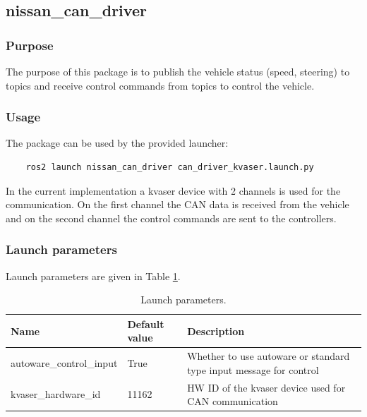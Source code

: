 \documentclass[sn-mathphys-num]{sn-jnl}%
\begin{document}
\subsection{nissan\_can\_driver}
\subsubsection{Purpose}
The purpose of this package is to publish the vehicle status (speed, steering) to topics and receive control commands from topics to control the vehicle.
\subsubsection{Usage}
The package can be used by the provided launcher:
\begin{lstlisting}
    ros2 launch nissan_can_driver can_driver_kvaser.launch.py
\end{lstlisting}
In the current implementation a kvaser device with 2 channels is used for the communication. On the first channel the CAN data is received from the vehicle and on the second channel the control commands are sent to the controllers.
\subsubsection{Launch parameters}
Launch parameters are given in Table \ref{tab:nissan_can_driver_params}.
\begin{table}[!h]
    \centering
    \captionsetup{justification=centering}
    \normalsize
    \caption{\label{tab:nissan_can_driver_params} Launch parameters.}
    \begin{tabular}{| l | l | l |}
        \hline
        \textbf{Name} & \textbf{Default value} & \textbf{Description} \\
        \hline
        autoware\_control\_input & True  & Whether to use autoware or standard type input message for control  \\
        \hline
        kvaser\_hardware\_id     & 11162 & HW ID of the kvaser device used for CAN communication \\
        \hline
    \end{tabular}
\end{table}
\end{document}
